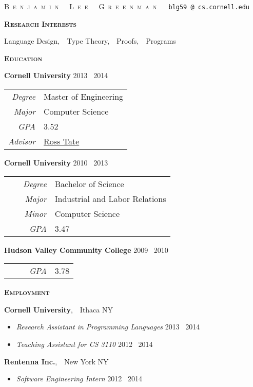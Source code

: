 \documentclass{article}
\makeatletter
\renewcommand{\maketitle}{
\hspace{-1.4cm} \textsc{\Large{B~e~n~j~a~m~i~n~~~L~e~e~~~G~r~e~e~n~m~a~n}}
~\hfill~
\texttt{\fontseries{m}blg59\,@\,cs.cornell.edu}
}
\newcommand{\mysection}[1]{\vspace{0.5cm}
\hspace{-1.3cm}\textsc{\textbf{#1}}~\hrulefill}
\makeatother
\begin{document}
\maketitle


\mysection{Research Interests}

Language Design,~~Type Theory,~~Proofs,~~Programs

\mysection{Education}

\textbf{Cornell University} \hfill 2013 \textendash\ 2014 \\
\begin{tabular}{>{\it}r l}
Degree & Master of Engineering\\
Major & Computer Science\\
GPA & 3.52\\
Advisor & \href{http://www.cs.cornell.edu/~ross/}{Ross Tate}
\end{tabular}

\textbf{Cornell University} \hfill 2010 \textendash\ 2013\\
\begin{tabular}{>{\it}r l}
Degree & Bachelor of Science\\
Major & Industrial and Labor Relations\\
Minor & Computer Science\\
~~~~~GPA & 3.47\\
\end{tabular}

\textbf{Hudson Valley Community College} \hfill 2009 \textendash\ 2010 \\ 
\begin{tabular}{>{\it}r l}
~~~~~GPA & 3.78\\
\end{tabular}

\mysection{Employment}

\textbf{Cornell University},~~Ithaca NY
\begin{itemize}[topsep=-0.2cm,itemsep=0.1cm]
\item \emph{Research Assistant in Programming Languages} \hfill 2013 \textendash\ 2014
\item \emph{Teaching Assistant for CS 3110} \hfill 2012 \textendash\ 2014
\end{itemize}

\textbf{Rentenna Inc.},~~New York NY
\begin{itemize}[topsep=-0.2cm,itemsep=0.1cm]
\item \emph{Software Engineering Intern} \hfill 2012 \textendash\ 2014
\end{itemize}
\end{document}
